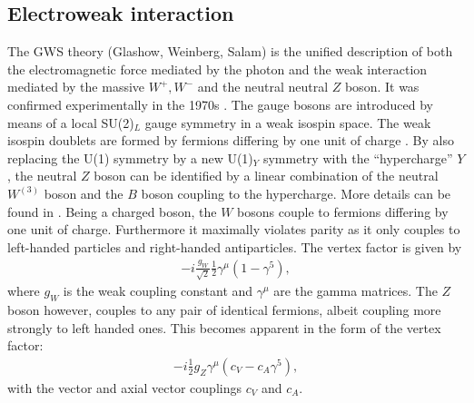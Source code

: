 \documentclass[twoside,        %
               BCOR12mm,       %
               ngerman,english, %
               fleqn,headsepline=false,footsepline=false
              ]{Vorlage/MFPREPORT}
\begin{document}
\subsection{Electroweak interaction}
The GWS theory (Glashow, Weinberg, Salam) is the unified description of both
the electromagnetic force mediated by the photon and the weak interaction
mediated by the massive $W^+,W^-$ and the neutral neutral $Z$ boson. It was
confirmed experimentally in the 1970s \cite{wikigsw}. 
The gauge bosons are introduced by means of a local SU(2)$_L$ gauge symmetry in
a weak isospin space. The weak isospin doublets are formed by fermions
differing by one unit of charge \cite[p.;416]{thomson}. By also replacing the
U(1) symmetry by a new U(1)$_Y$ symmetry with the ``hypercharge'' $Y$, the
neutral $Z$ boson can be identified by a linear combination of the neutral
$W^{(3)}$ boson and the $B$ boson coupling to the hypercharge. More details can
be found in \cite[p.\;418ff]{thomson}.
Being a charged boson,
the $W$ bosons couple to fermions differing by one unit of charge. Furthermore
it maximally violates parity as it only couples to left-handed particles and
right-handed antiparticles. The vertex factor is given by \cite[p.;409]{thomson}
\begin{align}
    \label{eq:vertexw}
    -i\frac{g_W}{\sqrt{2}}\frac{1}{2}\gamma^\mu(1-\gamma^5),
\end{align} where $g_W$ is the weak coupling constant and $\gamma^\mu$ are the
gamma matrices. The $Z$ boson however, couples to any pair of identical
fermions, albeit coupling more strongly to left handed ones. This becomes
apparent in the form of the vertex factor: \cite[p.]{thomson}
\begin{align}
    \label{eq:vertexz}
    -i\frac{1}{2}g_Z \gamma^\mu(c_V-c_A\gamma^5),
\end{align}
with the vector and axial vector couplings $c_V$ and $c_A$.
\end{document}
